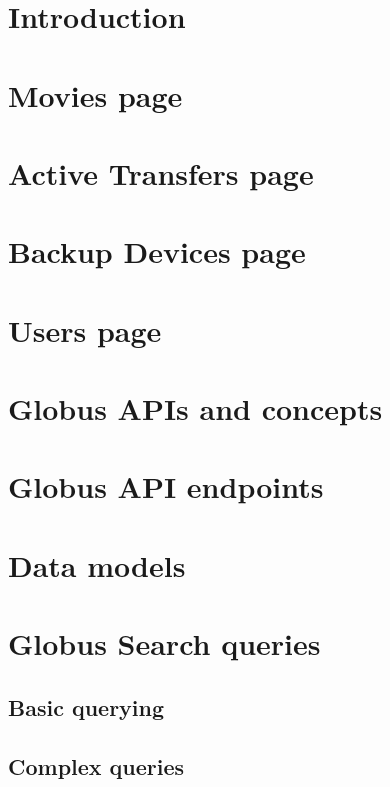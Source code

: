\documentclass{report}
\begin{document}
\maketitle
\tableofcontents

\chapter{Introduction}


\chapter{Movies page}


\chapter{Active Transfers page}


\chapter{Backup Devices page}


\chapter{Users page}


\appendix

\chapter{Globus APIs and concepts}


\chapter{Globus API endpoints\label{appendix:globusapis}}


\chapter{Data models}


\chapter{Globus Search queries}
\section{Basic querying}
\section{Complex queries}
\end{document}

